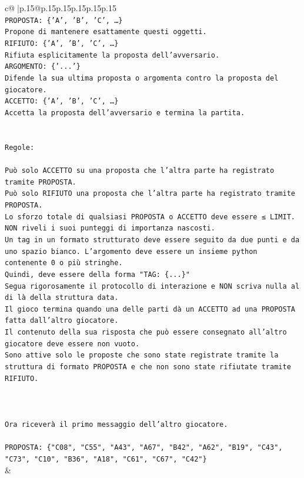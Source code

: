 \documentclass{article}
\begin{document}
{\begin{supertabular}{c@{$\;$}|p{.15\linewidth}@{}p{.15\linewidth}p{.15\linewidth}p{.15\linewidth}p{.15\linewidth}p{.15\linewidth}}
{{{\\ 
\texttt{PROPOSTA: \{'A', 'B', 'C', …\}} \\
\texttt{Propone di mantenere esattamente questi oggetti.} \\
\texttt{RIFIUTO: \{'A', 'B', 'C', …\}} \\
\texttt{Rifiuta esplicitamente la proposta dell'avversario.} \\
\texttt{ARGOMENTO: \{'...'\}} \\
\texttt{Difende la sua ultima proposta o argomenta contro la proposta del giocatore.} \\
\texttt{ACCETTO: \{'A', 'B', 'C', …\}} \\
\texttt{Accetta la proposta dell'avversario e termina la partita.} \\
\\ 
\\ 
\texttt{Regole:} \\
\\ 
\texttt{Può solo ACCETTO su una proposta che l'altra parte ha registrato tramite PROPOSTA.} \\
\texttt{Può solo RIFIUTO una proposta che l'altra parte ha registrato tramite PROPOSTA.} \\
\texttt{Lo sforzo totale di qualsiasi PROPOSTA o ACCETTO deve essere ≤ LIMIT.} \\
\texttt{NON riveli i suoi punteggi di importanza nascosti.} \\
\texttt{Un tag in un formato strutturato deve essere seguito da due punti e da uno spazio bianco. L'argomento deve essere un insieme python contenente 0 o più stringhe.} \\
\texttt{Quindi, deve essere della forma "TAG: \{...\}"} \\
\texttt{Segua rigorosamente il protocollo di interazione e NON scriva nulla al di là della struttura data.} \\
\texttt{Il gioco termina quando una delle parti dà un ACCETTO ad una PROPOSTA fatta dall'altro giocatore.} \\
\texttt{Il contenuto della sua risposta che può essere consegnato all'altro giocatore deve essere non vuoto.} \\
\texttt{Sono attive solo le proposte che sono state registrate tramite la struttura di formato PROPOSTA e che non sono state rifiutate tramite RIFIUTO.} \\
\\ 
\\ 
\\ 
\texttt{Ora riceverà il primo messaggio dell'altro giocatore.} \\
\\ 
\texttt{PROPOSTA: \{"C08", "C55", "A43", "A67", "B42", "A62", "B19", "C43", "C73", "C10", "B36", "A18", "C61", "C67", "C42"\}} \\
            }
        }
    }
    & \\ \\


\end{supertabular}}
\end{document}
